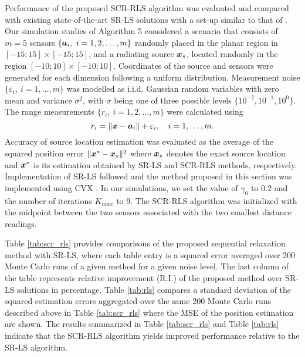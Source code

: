 Performance of the proposed SCR-RLS algorithm was evaluated and compared with existing state-of-the-art SR-LS solutions \cite{BeckStLi} with a set-up similar to that of \cite{BeckStLi}.   Our simulation studies of Algorithm 5 considered a scenario that consists of  $m = 5$ sensors $\{\mbox{\boldmath$a$}_i, \ i=1, 2,\ldots,m\}$ randomly placed in the planar region in $[-15;15]\times[-15;15]$, and a radiating source $\mbox{\boldmath$x$}_s$, located randomly in the region $[-10;10]\times[-10;10]$. Coordinates of the source and sensors were generated for each dimension following a uniform distribution. 
Measurement noise $\{\varepsilon_i, \ i=1,\ldots, m\}$ was modelled as i.i.d. Gaussian random variables with zero mean and variance $\sigma^2$, with $\sigma$ being one of three possible levels $\{10^{-2}, 10^{-1}, 10^{0}\}$. The range measurements $\{r_i, \ i=1, 2,\ldots, m\}$ were calculated using 
\setcounter{abc}{0}
\begin{equation} \label{eq:5.0}
\nonumber
r_i = \|{\mbox{\boldmath$x$}} - {\mbox{\boldmath$a$}}_i\| + \varepsilon_i, \quad i = 1, \ldots , m.
\end{equation}
Accuracy of source location estimation was evaluated as the average of the squared position error $\|\mbox{\boldmath$x$}^* - \mbox{\boldmath$x$}_s\|^2$ where $\mbox{\boldmath$x$}_s$ denotes the exact source location and $\mbox{\boldmath$x$}^*$ is its estimation obtained by SR-LS and SCR-RLS methods, respectively. Implementation of SR-LS followed \cite{BeckStLi} and the method proposed in this section was implemented using CVX \cite{cvx}. In our simulations, we set the value of $\gamma_0$ to 0.2 and the number of iterations $K_{max}$ to 9. The SCR-RLS algorithm was initialized with the midpoint between the two sensors associated with the two smallest distance readings. 


Table \ref{tab:scr_rls} provides comparisons of the proposed sequential relaxation method with SR-LS, where each table entry is a squared error averaged over 200 Monte Carlo runs of a given method for a given noise level. The last column of the table  represents relative improvement (R.I.) of the proposed method over SR-LS solutions in percentage. %
Table \ref{tab:rls} compares a standard deviation of the squared  estimation errors  aggregated over the  same 200 Monte Carlo runs described above in Table \ref{tab:scr_rls} where the MSE of the position estimation are shown. The results
summarized in  Table \ref{tab:scr_rls} and Table \ref{tab:rls} indicate that the SCR-RLS algorithm yields improved performance relative to the SR-LS algorithm.

